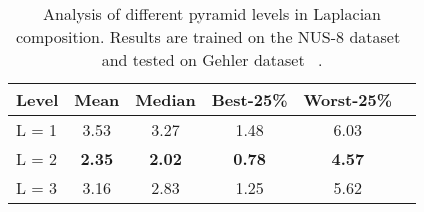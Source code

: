 \begin{table}[t]
\centering
\small
\caption{Analysis of different pyramid levels in Laplacian composition. Results are trained on the NUS-8 dataset~\cite{cheng2014illuminant} and tested on Gehler dataset~\cite{4587765} .}
\begin{tabular}{lccccc}
\toprule
Level & Mean & Median & Best-25\% & Worst-25\% &\\
\midrule
L = 1 & 3.53 & 3.27 & 1.48 & 6.03\\
L = 2 & \textbf{2.35} & \textbf{2.02} & \textbf{0.78} & \textbf{4.57}  \\
L = 3 & 3.16 & 2.83 & 1.25 & 5.62\\
\bottomrule
\end{tabular}
\label{tab:pyramid_levels}
\end{table}